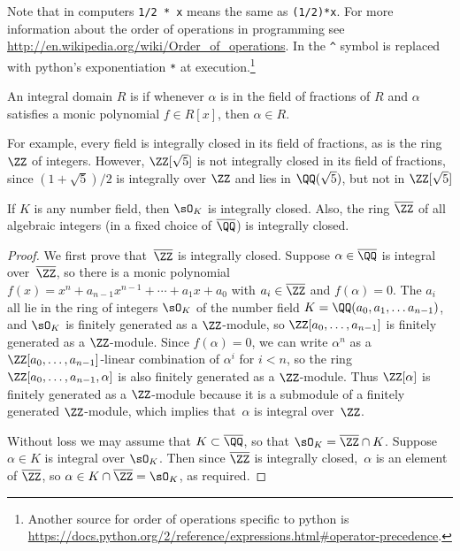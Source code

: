 \begin{remark}
  Note that in computers {\tt 1/2 * x} means the same as {\tt (1/2)*x}.
  For more information about the order of operations in programming see
  \url{http://en.wikipedia.org/wiki/Order_of_operations}.
  In {\Sage} the {\tt \string^} symbol is replaced with python's
  exponentiation {\tt **} at execution.\footnote{
    Another source for order of operations specific to python is
    \url{https://docs.python.org/2/reference/expressions.html\#operator-precedence}.
  }
\end{remark}

\begin{definition}
  An integral domain $R$ is  if whenever $\alpha$ is in the field of fractions of $R$
  and $\alpha$ satisfies a monic polynomial $f\in R[x]$, then $\alpha
  \in R$.
\end{definition}

For example, every field is integrally closed in its field of
fractions, as is the ring $\ZZ$ of integers.  However, $\ZZ[\sqrt{5}]$
is not integrally closed in its field of fractions, since
$(1+\sqrt{5})/2$ is integrally over $\ZZ$ and lies in $\QQ(\sqrt{5})$,
but not in $\ZZ[\sqrt{5}]$

\begin{proposition}\label{prop:integrallyclosed}
  If $K$ is any number field, then $\sO_K$ is integrally closed.  Also,
  the ring $\overline{\ZZ}$ of all algebraic integers (in a fixed choice of $\overline{\QQ}$)
  is integrally closed.
\end{proposition}
\begin{proof}
  We first prove that~$\overline{\ZZ}$ is integrally closed.  Suppose $\alpha\in\overline{\QQ}$
  is integral over~$\overline{\ZZ}$, so there is a monic polynomial $f(x)=x^n +
  a_{n-1}x^{n-1} + \cdots + a_1 x + a_0$ with $a_i\in\overline{\ZZ}$ and
  $f(\alpha)=0$.  The $a_i$ all lie in the ring of integers $\sO_K$ of the
  number field $K=\QQ(a_0,a_1,\dots a_{n-1})$, and $\sO_K$ is finitely
  generated as a $\ZZ$-module, so $\ZZ[a_0,\dots, a_{n-1}]$ is finitely
  generated as a $\ZZ$-module.  Since $f(\alpha)=0$, we can write $\alpha^n$
  as a $\ZZ[a_0,\dots, a_{n-1}]$-linear combination of $\alpha^i$ for $i<n$,
  so the ring $\ZZ[a_0,\dots, a_{n-1},\alpha]$ is also finitely generated
  as a $\ZZ$-module.  Thus $\ZZ[\alpha]$ is finitely generated as a $\ZZ$-module
  because it is a submodule of a finitely generated $\ZZ$-module, which
  implies that~$\alpha$ is integral over~$\ZZ$.

  Without loss we may assume that $K\subset \overline{\QQ}$, so that
  $\sO_K = \overline{\ZZ} \cap K$.
  Suppose $\alpha\in K$ is integral over $\sO_K$.  Then since $\overline{\ZZ}$ is
  integrally closed,~$\alpha$ is an element of $\overline{\ZZ}$, so
  $\alpha\in K \cap \overline{\ZZ}=\sO_K$, as required.
\end{proof}

